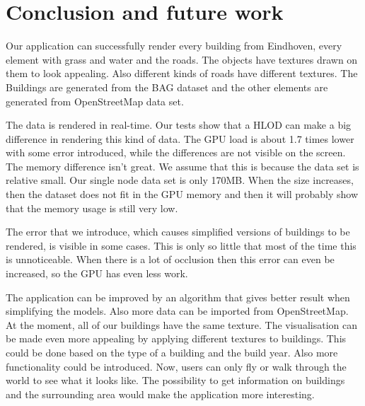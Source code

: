 \chapter{Conclusion and future work}
\label{chap:ConclusionAndFutureWork}
Our application can successfully render every building from Eindhoven, every element with grass and water and the roads. The objects have textures drawn on them to look appealing. Also different kinds of roads have different textures. The Buildings are generated from the BAG dataset and the other elements are generated from OpenStreetMap data set.

The data is rendered in real-time. Our tests show that a HLOD can make a big difference in rendering this kind of data. The GPU load is about 1.7 times lower with some error introduced, while the differences are not visible on the screen. The memory difference isn’t great. We assume that this is because the data set is relative small. Our single node data set is only 170MB. When the size increases, then the dataset does not fit in the GPU memory and then it will probably show that the memory usage is still very low.

The error that we introduce, which causes simplified versions of buildings to be rendered, is visible in some cases. This is only so little that most of the time this is unnoticeable. When there is a lot of occlusion then this error can even be increased, so the GPU has even less work.

The application can be improved by an algorithm that gives better result when simplifying the models. Also more data can be imported from OpenStreetMap. At the moment, all of our buildings have the same texture. The visualisation can be made even more appealing by applying different textures to buildings. This could be done based on the type of a building and the build year. Also more functionality could be introduced. Now, users can only fly or walk through the world to see what it looks like. The possibility to get information on buildings and the surrounding area would make the application more interesting.
